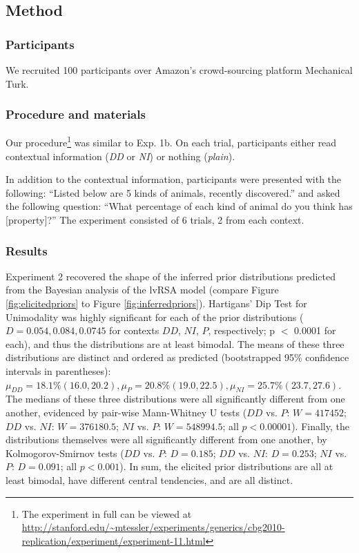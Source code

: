 \documentclass[10pt,letterpaper]{article}
\begin{document}
\subsection{Method}

\subsubsection{Participants}

We recruited 100 participants over Amazon's crowd-sourcing platform Mechanical Turk. 

\subsubsection{Procedure and materials}

Our procedure\footnote{The experiment in full can be viewed at \url{http://stanford.edu/~mtessler/experiments/generics/cbg2010-replication/experiment/experiment-11.html}} was similar to Exp. 1b. On each trial, participants either read contextual information (\emph{DD} or \emph{NI}) or nothing (\emph{plain}). 

In addition to the contextual information, participants were presented with the following: ``Listed below are 5 kinds of animals, recently discovered.'' and asked the following question: ``What percentage of each kind of animal do you think has [property]?'' The experiment consisted of 6 trials, 2 from each context. 

\subsubsection{Results}

Experiment 2 recovered the shape of the inferred prior distributions predicted from the Bayesian analysis of the lvRSA model (compare Figure \ref{fig:elicitedpriors} to Figure \ref{fig:inferredpriors}). 
%
Hartigans' Dip Test for Unimodality was highly significant for each of the prior distributions ($D = 0.054, 0.084, 0.0745$ for contexts $DD$, $NI$, $P$, respectively; p $<$ 0.0001 for each), and thus the distributions are at least bimodal. 
%
The means of these three distributions are distinct and ordered as predicted (bootstrapped 95\% confidence intervals in parentheses): $\mu_{DD} = 18.1\% (16.0, 20.2), \mu_{P} = 20.8\% (19.0, 22.5), \mu_{NI} = 25.7\% (23.7, 27.6)$.
%
The medians of these three distributions were all significantly different from one another, evidenced by pair-wise Mann-Whitney U tests ($DD$ vs. $P$: $W=417452$; $DD$ vs. $NI$: $W=376180.5$; $NI$ vs. $P$: $W=548994.5$; all $p < 0.00001$). 
%
Finally, the distributions themselves were all significantly different from one another, by Kolmogorov-Smirnov tests ($DD$ vs. $P$: $D = 0.185$; $DD$ vs. $NI$: $D = 0.253$; $NI$ vs. $P$: $D = 0.091$; all $p < 0.001$). In sum, the elicited prior distributions are all at least bimodal, have different central tendencies, and are all distinct.
\end{document}
